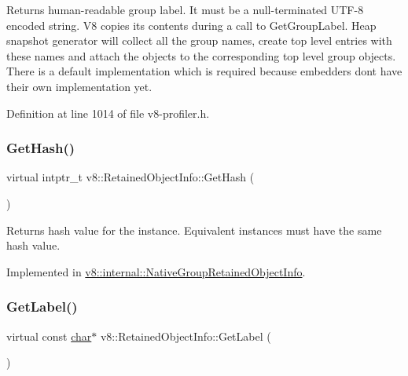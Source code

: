 Returns human-\/readable group label. It must be a null-\/terminated U\+T\+F-\/8 encoded string. V8 copies its contents during a call to Get\+Group\+Label. Heap snapshot generator will collect all the group names, create top level entries with these names and attach the objects to the corresponding top level group objects. There is a default implementation which is required because embedders don\textquotesingle{}t have their own implementation yet. 

Definition at line 1014 of file v8-\/profiler.\+h.

\mbox{\label{classv8_1_1RetainedObjectInfo_a6fdbfa242b95615e63f08433419c8066}} 
\subsubsection{\texorpdfstring{Get\+Hash()}{GetHash()}}
{\footnotesize\ttfamily virtual intptr\+\_\+t v8\+::\+Retained\+Object\+Info\+::\+Get\+Hash (\begin{DoxyParamCaption}{ }\end{DoxyParamCaption})\hspace{0.3cm}{\ttfamily [pure virtual]}}

Returns hash value for the instance. Equivalent instances must have the same hash value. 

Implemented in \mbox{\hyperlink{classv8_1_1internal_1_1NativeGroupRetainedObjectInfo_a0bb1682d322ad1c63b22058cf5a75a6f}{v8\+::internal\+::\+Native\+Group\+Retained\+Object\+Info}}.

\mbox{\label{classv8_1_1RetainedObjectInfo_ad19106fc7f0499fd45005077551d54c0}} 
\subsubsection{\texorpdfstring{Get\+Label()}{GetLabel()}}
{\footnotesize\ttfamily virtual const \mbox{\hyperlink{classchar}{char}}$\ast$ v8\+::\+Retained\+Object\+Info\+::\+Get\+Label (\begin{DoxyParamCaption}{ }\end{DoxyParamCaption})\hspace{0.3cm}{\ttfamily [pure virtual]}}

